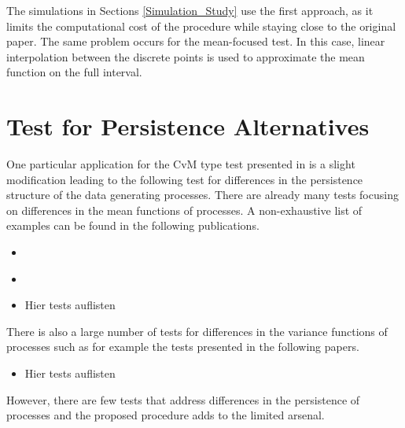 \documentclass[12pt, a4paper]{article}
\theoremstyle{MAstyle} \newtheorem{assumption}{Assumption}[section]
\theoremstyle{MAstyle} \newtheorem{definition}{Definition}[section]
\theoremstyle{MAstyle} \newtheorem{theorem}{Theorem}[section]
\begin{document}
			The simulations in Sections \ref{Simulation_Study} use the first approach, as it limits the computational cost of the procedure while staying close to the original paper. The same problem occurs for the mean-focused test. In this case, linear interpolation between the discrete points is used to approximate the mean function on the full interval.

		
	\section{Test for Persistence Alternatives}\label{variant}
		One particular application for the CvM type test presented in \cite{bugni_permutation_2021} is a slight modification leading to the following test for differences in the persistence structure of the data generating processes. 
		There are already many tests focusing on differences in the mean functions of processes. A non-exhaustive list of examples can be found in the following publications.
		\begin{itemize}
			\item \cite{lee_two_2015}
			\item \cite{cox_pointwise_2008}
			\item {\color{red} Hier tests auflisten}
		\end{itemize}
		There is also a large number of tests for differences in the variance functions of processes such as for example the tests presented in the following papers. 
		\begin{itemize}
			\item {\color{red} Hier tests auflisten}
		\end{itemize}
		However, there are few tests that address differences in the persistence of processes and the proposed procedure adds to the limited arsenal.\\
		
\end{document}
